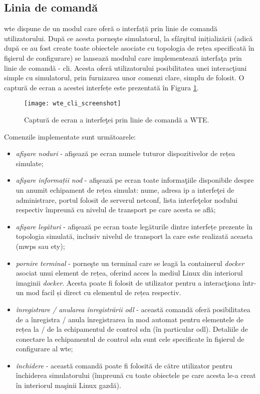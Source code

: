 \subsection{Linia de comandă}

\gls{wte} dispune de un modul care oferă o interfață prin linie de comandă utilizatorului. După ce acesta porneşte simulatorul, la sfârşitul inițializării (adică după ce au fost create toate obiectele asociate cu topologia de rețea specificată în fişierul de configurare) se lansează modulul care implementează interfaţa prin linie de comandă - \gls{cli}. Acesta oferă utilizatorului posibilitatea unei interacţiuni simple cu simulatorul, prin furnizarea unor comenzi clare, simplu de folosit. O captură de ecran a acestei interfețe este prezentată în Figura \ref{fig:wte_cli_screenshot}.

\begin{figure}[h]
	\centering
	\texttt{[image: wte\_cli\_screenshot]}
	\caption{Captură de ecran a interfeţei prin linie de comandă a WTE.}
	\label{fig:wte_cli_screenshot}
\end{figure}

Comenzile implementate sunt următoarele:
\begin{itemize}
	\item \textit{afişare noduri} - afişează pe ecran numele tuturor dispozitivelor de rețea simulate;
	\item \textit{afişare informații nod} - afişează pe ecran toate informaţiile disponibile despre un anumit echipament de rețea simulat: nume, adresa \gls{ip} a interfeţei de administrare, portul folosit de serverul \gls{netconf}, lista interfeţelor nodului respectiv împreună cu nivelul de transport pe care acesta se află;
	\item \textit{afişare legături} - afişează pe ecran toate legăturile dintre interfețe prezente în topologia simulată, inclusiv nivelul de transport la care este realizată aceasta (\gls{mwps} sau \gls{ety});
	\item \textit{pornire terminal} - porneşte un terminal care se leagă la containerul \textit{docker} asociat unui element de rețea, oferind acces la mediul Linux din interiorul imaginii \textit{docker}. Acesta poate fi folosit de utilizator pentru a interacţiona într-un mod facil și direct cu elementul de rețea respectiv.
	\item \textit{înregistrare / anularea înregistrării \gls{odl}} - această comandă oferă posibilitatea de a înregistra / anula înregistrarea în mod automat pentru elementele de rețea la / de la echipamentul de control \gls{sdn} (în particular \gls{odl}). Detaliile de conectare la echipamentul de control \gls{sdn} sunt cele specificate în fişierul de configurare al \gls{wte};
	\item \textit{închidere} - această comandă poate fi folosită de către utilizator pentru închiderea simulatorului (împreună cu toate obiectele pe care acesta le-a creat în interiorul maşinii Linux gazdă).
\end{itemize}

